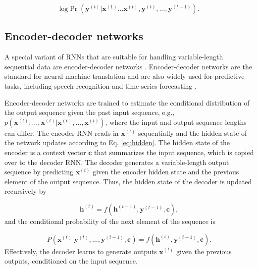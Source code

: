 \documentclass[hidelinks,12pt]{article}
\begin{document}
\begin{equation}
\text{log} \Pr \left(\boldsymbol{y}^{(t)} | \boldsymbol{x}^{(1)} \ldots \boldsymbol{x}^{(t)},\boldsymbol{y}^{(t)}, \ldots, \boldsymbol{y}^{(t-1)} \right).
\end{equation}

\subsection{Encoder-decoder networks}

A special variant of RNNs that are suitable for handling variable-length sequential data are encoder-decoder networks \citep{cho2014learning}. Encoder-decoder networks are the standard for neural machine translation \citep{bahdanau2014neural,vinyals2014grammar} and are also widely used for predictive tasks, including speech recognition \citep{chorowski2015attention} and time-series forecasting \citep{zhu2017deep}. 

Encoder-decoder networks are trained to estimate the conditional distribution of the output sequence given the past input sequence, e.g., $p (\boldsymbol{x}^{(t)}, \ldots, \boldsymbol{x}^{(t)} | \boldsymbol{x}^{(t)}, \ldots, \boldsymbol{x}^{(t)})$, where the input and output sequence lengths can differ. The encoder RNN reads in $\boldsymbol{x}^{(t)}$ sequentially and the hidden state of the network updates according to Eq. \ref{eq:hidden}. The hidden state of the encoder is a context vector $\boldsymbol{c}$ that summarizes the input sequence, which is copied over to the decoder RNN. The decoder generates a variable-length output sequence by predicting $\boldsymbol{x}^{(t)}$ given the encoder hidden state and the previous element of the output sequence. Thus, the hidden state of the decoder is updated recursively by

\begin{equation}
\boldsymbol{h}^{(t)} = f \left( \boldsymbol{h}^{(t-1)}, \boldsymbol{y}^{(t-1)}, \boldsymbol{c} \right), \label{eq:decoder}
\end{equation} and the conditional probability of the next element of the sequence is 

\begin{equation}
P (\boldsymbol{x}^{(t)} | \boldsymbol{y}^{(t)}, \ldots, \boldsymbol{y}^{(t-1)}, \boldsymbol{c}) =  f \left( \boldsymbol{h}^{(t)}, \boldsymbol{y}^{(t-1)}, \boldsymbol{c} \right).
\end{equation}  Effectively, the decoder learns to generate outputs $\boldsymbol{x}^{(t)}$ given the previous outputs, conditioned on the input sequence. 
\end{document}
